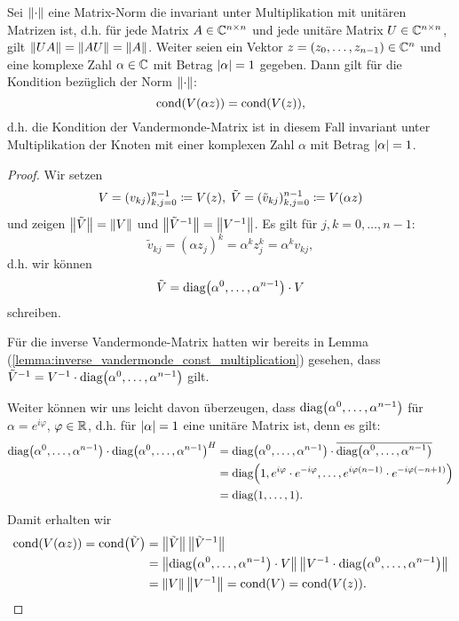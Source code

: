 \begin{lemma}
    Sei $\left\lVert \cdot \right\rVert$ eine Matrix-Norm die invariant unter Multiplikation mit unitären
    Matrizen ist, d.h. für jede Matrix $A \in \mathbb{C}^{n\times n}$ und jede
    unitäre Matrix $U \in \mathbb{C}^{n\times n}$, gilt $\left\lVert UA \right\rVert = \left\lVert AU \right\rVert = \left\lVert A \right\rVert$.
    Weiter seien ein Vektor $z = (z_0, \dots, z_{n-1}) \in \mathbb{C}^n$ und eine
    komplexe Zahl $\alpha \in \mathbb{C}$ mit Betrag $\left\lvert \alpha \right\rvert = 1$ gegeben.
    Dann gilt für die Kondition bezüglich der Norm $\left\lVert \cdot \right\rVert$:
    \[
        \text{cond$ \left( \text{$V(\alpha z)$} \right)$} = \text{cond$ \left( \text{$V(z)$} \right)$},
    \]
    d.h. die Kondition der Vandermonde-Matrix ist in diesem Fall invariant
    unter Multiplikation der Knoten mit einer komplexen Zahl $\alpha$ mit
    Betrag $\left\lvert \alpha \right\rvert = 1$.
\end{lemma}

\begin{proof}
    Wir setzen
    \[
        V = (v_{kj})_{k,j=0}^{n-1} \coloneqq \text{$V(z)$}, \;
        \tilde{V} = (\tilde{v}_{kj})_{k,j=0}^{n-1} \coloneqq \text{$V(\alpha z)$}
    \]
    und zeigen $\left\lVert \tilde{V} \right\rVert = \left\lVert V \right\rVert$ und
    $\left\lVert \tilde{V}^{-1} \right\rVert = \left\lVert V^{-1} \right\rVert$.
    Es gilt für $j,k = 0,\dots,n-1$:
    \[
        \tilde{v}_{kj} = (\alpha z_j)^k = \alpha^k z_j^k = \alpha^k v_{kj},
    \]
    d.h. wir können
    \[
        \tilde{V} = \text{diag$ \left( \alpha^0, \dots, \alpha^{n-1} \right)$} \cdot V
    \]
    schreiben.

    \noindent Für die inverse Vandermonde-Matrix hatten wir bereits in
    Lemma (\ref{lemma:inverse_vandermonde_const_multiplication})
    gesehen, dass $ \tilde{V}^{-1} = V^{-1} \cdot \text{diag$ \left( \alpha^{0}, \dots, \alpha^{n-1} \right)$} $ gilt.

    \noindent Weiter können wir uns leicht davon überzeugen, dass
    $\text{diag$ \left( \alpha^0, \dots, \alpha^{n-1} \right)$}$
    für $\alpha = e^{i\varphi}$, $\varphi \in \mathbb{R}$, d.h. für $\left\lvert \alpha \right\rvert = 1$
    eine unitäre Matrix ist, denn es gilt:
    \[
        \begin{split}
               \text{diag$ \left( \alpha^0, \dots, \alpha^{n-1} \right)$} \cdot \text{diag$ \left( \alpha^0, \dots, \alpha^{n-1} \right)$}^{H}
            &= \text{diag$ \left( \alpha^0, \dots, \alpha^{n-1} \right)$} \cdot \overline{\text{diag$ \left( \alpha^0, \dots, \alpha^{n-1} \right)$}}\\
            &= \text{diag$ \left( 1, e^{i\varphi} \cdot e^{-i\varphi}, \dots, e^{i\varphi (n-1)} \cdot e^{-i \varphi (-n+1)} \right)$}\\
            &= \text{diag$ \left( 1, \dots, 1 \right)$}.
        \end{split}
    \]
    Damit erhalten wir
    \[
        \begin{split}
            \text{cond$ \left( \text{$V(\alpha z)$} \right)$}
            = \text{cond$ \left( \tilde{V} \right)$}
            &= \left\lVert \tilde{V} \right\rVert \left\lVert \tilde{V}^{-1} \right\rVert\\
            &= \left\lVert \text{diag$ \left( \alpha^0, \dots, \alpha^{n-1} \right)$} \cdot V \right\rVert \left\lVert V^{-1} \cdot \text{diag$ \left( \alpha^0, \dots, \alpha^{n-1} \right)$} \right\rVert\\
            &= \left\lVert V \right\rVert \left\lVert V^{-1} \right\rVert
            = \text{cond$ \left( V \right)$} = \text{cond$ \left( \text{$V(z)$} \right)$}.
        \end{split}
    \]
\end{proof}

